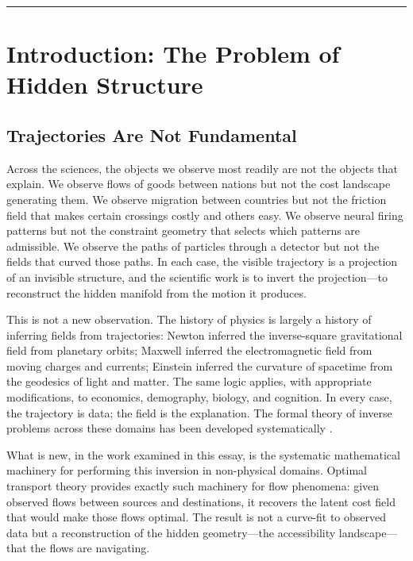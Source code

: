 \documentclass[12pt]{article}
\begin{document}
\vspace{1em}
\hrule
\vspace{2em}

\section{Introduction: The Problem of Hidden Structure}

\subsection{Trajectories Are Not Fundamental}

Across the sciences, the objects we observe most readily are not the objects that explain. We observe flows of goods between nations but not the cost landscape generating them. We observe migration between countries but not the friction field that makes certain crossings costly and others easy. We observe neural firing patterns but not the constraint geometry that selects which patterns are admissible. We observe the paths of particles through a detector but not the fields that curved those paths. In each case, the visible trajectory is a projection of an invisible structure, and the scientific work is to invert the projection---to reconstruct the hidden manifold from the motion it produces.

This is not a new observation. The history of physics is largely a history of inferring fields from trajectories: Newton inferred the inverse-square gravitational field from planetary orbits; Maxwell inferred the electromagnetic field from moving charges and currents; Einstein inferred the curvature of spacetime from the geodesics of light and matter. The same logic applies, with appropriate modifications, to economics, demography, biology, and cognition. In every case, the trajectory is data; the field is the explanation. The formal theory of inverse problems across these domains has been developed systematically \citep{kaipio2006, tarantola2005}.

What is new, in the work examined in this essay, is the systematic mathematical machinery for performing this inversion in non-physical domains. Optimal transport theory provides exactly such machinery for flow phenomena: given observed flows between sources and destinations, it recovers the latent cost field that would make those flows optimal. The result is not a curve-fit to observed data but a reconstruction of the hidden geometry---the accessibility landscape---that the flows are navigating.
\end{document}
